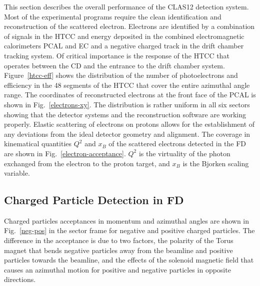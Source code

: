 \documentclass[final,3p,twocolumn]{elsarticle}
\begin{document}
This section describes the overall performance of the CLAS12 detection system. Most of the experimental programs
require the clean identification and reconstruction of the scattered electron. Electrons are identified by a combination
of signals in the HTCC and energy deposited in the combined electromagnetic calorimeters PCAL and EC and a negative
charged track in the drift chamber tracking system. Of critical importance is the response of the HTCC that operates
between the CD and the entrance to the drift chamber system. Figure~\ref{htcc-eff} shows the distribution of the
number of photoelectrons and efficiency in the 48 segments of the HTCC that cover the entire azimuthal angle range. 
The coordinates of reconstructed electrons at the front face of the PCAL is shown in Fig.~\ref{electrons-xy}. The
distribution is rather uniform in all six sectors showing that the detector systems and the reconstruction software are
working properly. Elastic scattering  of electrons on protons allows for the establishment of any deviations from the ideal
detector geometry and alignment. The coverage in kinematical quantities $Q^2$ and $x_B$ of the scattered electrons
detected in the FD are shown in Fig.~\ref{electron-acceptance}. $Q^2$ is the virtuality of the photon exchanged from
the electron to the proton target, and $x_B$ is the Bjorken scaling variable.

\subsection{Charged Particle Detection in FD}
 
Charged particles acceptances in momentum and azimuthal angles are shown in Fig.~\ref{neg-pos} in the sector frame
for negative and positive charged particles. The difference in the acceptance is due to two factors, the polarity of the
Torus magnet that bends negative particles away from the beamline and positive particles towards the beamline, and
the effects of the solenoid magnetic field that causes an azimuthal motion for positive and negative particles in opposite
directions. 
\end{document}
